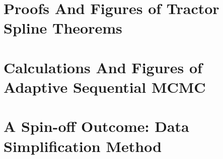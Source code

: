 \documentclass[12pt,twoside]{report}
\begin{document}


\begin{appendices}
\makeatletter
{}
\makeatother
 \chapter{Proofs And Figures of Tractor Spline Theorems}\label{appendTS}

 \chapter{Calculations And Figures of Adaptive Sequential MCMC}\label{appendMCMC}
  
 \chapter{A Spin-off Outcome: Data Simplification Method}\label{appendSimp}
  
\end{appendices}



\clearemptydoublepage
\end{document}
